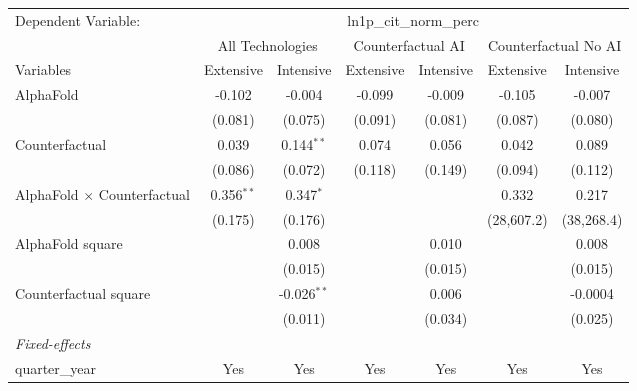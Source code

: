 \begingroup
\centering
\begin{tabular}{lcccccc}
   \tabularnewline \midrule \midrule
   Dependent Variable: & \multicolumn{6}{c}{ln1p\_cit\_norm\_perc}\\
 & \multicolumn{2}{c}{All Technologies} & \multicolumn{2}{c}{Counterfactual AI} & \multicolumn{2}{c}{Counterfactual No AI} \\
\cmidrule(lr){1-1}\cmidrule(lr){2-3} \cmidrule(lr){4-5} \cmidrule(lr){6-7}
Variables & \multicolumn{1}{c}{Extensive} & \multicolumn{1}{c}{Intensive} & \multicolumn{1}{c}{Extensive} & \multicolumn{1}{c}{Intensive} & \multicolumn{1}{c}{Extensive} & \multicolumn{1}{c}{Intensive} \\
\cmidrule(lr){1-1}\cmidrule(lr){2-2} \cmidrule(lr){3-3} \cmidrule(lr){4-4} \cmidrule(lr){5-5} \cmidrule(lr){6-6} \cmidrule(lr){7-7}
   AlphaFold                          & -0.102       & -0.004        & -0.099  & -0.009  & -0.105     & -0.007\\   
                                      & (0.081)      & (0.075)       & (0.091) & (0.081) & (0.087)    & (0.080)\\   
   Counterfactual                     & 0.039        & 0.144$^{**}$  & 0.074   & 0.056   & 0.042      & 0.089\\   
                                      & (0.086)      & (0.072)       & (0.118) & (0.149) & (0.094)    & (0.112)\\   
   AlphaFold $\times$ Counterfactual  & 0.356$^{**}$ & 0.347$^{*}$   &         &         & 0.332      & 0.217\\   
                                      & (0.175)      & (0.176)       &         &         & (28,607.2) & (38,268.4)\\   
   AlphaFold square                   &              & 0.008         &         & 0.010   &            & 0.008\\   
                                      &              & (0.015)       &         & (0.015) &            & (0.015)\\   
   Counterfactual square              &              & -0.026$^{**}$ &         & 0.006   &            & -0.0004\\   
                                      &              & (0.011)       &         & (0.034) &            & (0.025)\\   
   \midrule
   \emph{Fixed-effects}\\
   quarter\_year                      & Yes          & Yes           & Yes     & Yes     & Yes        & Yes\\  

\end{tabular}
